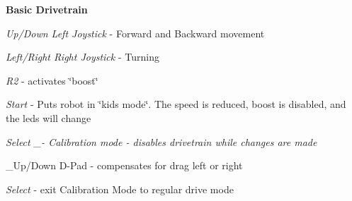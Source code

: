 
\begin{DoxyItemize}
\item {\bfseries Basic Drivetrain}
\begin{DoxyItemize}
\item {\itshape Up/\+Down Left Joystick} -\/ Forward and Backward movement
\item {\itshape Left/\+Right Right Joystick} -\/ Turning
\item {\itshape R2} -\/ activates \char`\"{}boost\char`\"{}
\item {\itshape Start} -\/ Puts robot in \char`\"{}kids mode\char`\"{}. The speed is reduced, boost is disabled, and the leds will change
\item {\itshape Select \+\_\+-\/ Calibration mode -\/ disables drivetrain while changes are made
\begin{DoxyItemize}
\item \+\_\+\+Up/\+Down D-\/\+Pad -\/ compensates for drag left or right
\item {\itshape Select} -\/ exit Calibration Mode to regular drive mode 
\end{DoxyItemize}}
\end{DoxyItemize}
\end{DoxyItemize}